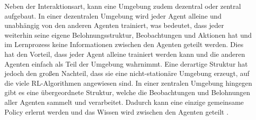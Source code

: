 Neben der Interaktionsart, kann eine Umgebung zudem dezentral oder zentral aufgebaut. In einer dezentralen Umgebung wird jeder Agent alleine und unabhängig von den anderen Agenten trainiert, was bedeutet, dass jeder weiterhin seine eigene Belohnungsstruktur, Beobachtungen und Aktionen hat und im Lernprozess keine Informationen zwischen den Agenten geteilt werden. Dies hat den Vorteil, dass jeder Agent alleine trainiert werden kann und die anderen Agenten einfach als Teil der Umgebung wahrnimmt. Eine derartige Struktur hat jedoch den großen Nachteil, dass sie eine nicht-stationäre Umgebung erzeugt, auf die viele \ac{RL}-Algorithmen angewiesen sind.
In einer zentralen Umgebung hingegen gibt es eine übergeordnete Struktur, welche die Beobachtungen und Belohnungen aller Agenten sammelt und verarbeitet. Dadurch kann eine einzige gemeinsame Policy erlernt werden und das Wissen wird zwischen den Agenten geteilt \cite{Tan:1993}. %
